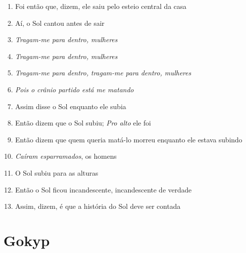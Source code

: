 \begin{enumerate}
\item Foi então que, dizem, ele saiu pelo esteio central da casa
\item Aí, o Sol cantou antes de sair
\item \textit{Tragam-me para dentro, mulheres}
\item \textit{Tragam-me para dentro, mulheres}
\item \textit{Tragam-me para dentro, tragam-me para dentro, mulheres}
\item \textit{Pois o crânio partido está me matando}
\item Assim disse o Sol enquanto ele subia
\item Então dizem que o Sol subiu; \textit{Pro alto} ele foi
\item Então dizem que quem queria matá-lo morreu enquanto ele estava subindo
\item \textit{Caíram esparramados}, os homens

\begin{center}\end{center}

\item O Sol subiu para as alturas
\item Então o Sol ficou incandescente, incandescente de verdade
\item Assim, dizem, é que a história do Sol deve ser contada
\end{enumerate}

\chapter{Gokyp}

